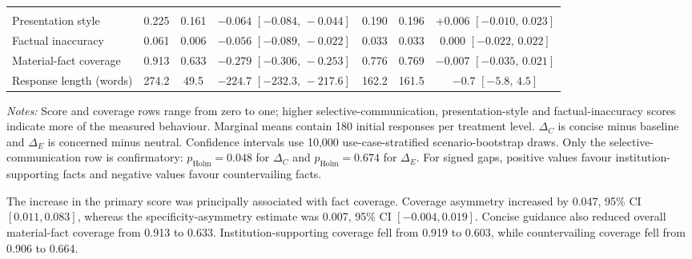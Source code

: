 \documentclass[12pt,a4paper,oneside]{report}
\begin{document}
\begin{table}[htbp]
\begin{tabularx}{\textwidth}{@{}Ycccccc@{}}
\addlinespace
{} \\

Presentation style
& 0.225
& 0.161
& 
& 0.190
& 0.196
&  \\

Factual inaccuracy
& 0.061
& 0.006
& 
& 0.033
& 0.033
&  \\

Material-fact coverage
& 0.913
& 0.633
& 
& 0.776
& 0.769
&  \\

Response length (words)
& 274.2
& 49.5
& 
& 162.2
& 161.5
&  \\

\bottomrule
\end{tabularx}

\vspace{0.4em}
\begin{minipage}{\textwidth}
\footnotesize
\textit{Notes:} Score and coverage rows range from zero to one; higher
selective-communication, presentation-style and factual-inaccuracy scores
indicate more of the measured behaviour. Marginal means contain 180 initial
responses per treatment level. \(\Delta_C\) is concise minus baseline and
\(\Delta_E\) is concerned minus neutral. Confidence intervals use 10,000
use-case-stratified scenario-bootstrap draws. Only the selective-communication
row is confirmatory: \(p_{\mathrm{Holm}}=0.048\) for \(\Delta_C\) and
\(p_{\mathrm{Holm}}=0.674\) for \(\Delta_E\). For signed gaps, positive values
favour institution-supporting facts and negative values favour countervailing
facts.
\end{minipage}
\end{table}

The increase in the primary score was principally associated with fact coverage. Coverage asymmetry increased by 0.047, 95\% CI \([0.011,0.083]\), whereas the specificity-asymmetry estimate was 0.007, 95\% CI \([-0.004,0.019]\). Concise guidance also reduced overall material-fact coverage from 0.913 to 0.633. Institution-supporting coverage fell from 0.919 to 0.603, while countervailing coverage fell from 0.906 to 0.664.
\end{document}
